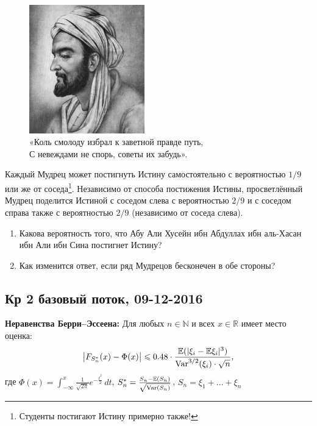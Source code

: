 \documentclass[12pt, a4paper]{article}\usepackage[]{graphicx}\usepackage[]{color}
\begin{document}
\begin{enumerate}
\begin{figure}[h!]
  \begin{center}
\includegraphics[width=5cm]{images/abu_ali.jpg}
  \caption*{«Коль смолоду избрал к заветной правде путь, \\
 С невеждами не спорь, советы их забудь». }
 \end{center}
\end{figure}


Каждый Мудрец может постигнуть Истину самостоятельно с вероятностью $1/9$ или же от соседа\footnote{Студенты постигают Истину примерно также!}. Независимо от способа постижения Истины, просветлённый Мудрец поделится Истиной с соседом слева с вероятностью $2/9$ и с соседом справа также с вероятностью $2/9$ (независимо от соседа слева).


\begin{enumerate}
\item Какова вероятность того, что Абу Али Хусейн ибн Абдуллах ибн аль-Хасан ибн Али ибн Сина постигнет Истину?
\item Как изменится ответ, если ряд Мудрецов бесконечен в обе стороны?
\end{enumerate}

\end{enumerate}


\subsection{Кр 2 базовый поток, 09-12-2016}


\textbf{Неравенства Берри–Эссеена:} Для любых $n \in \mathbb{N}$ и всех $x \in \mathbb{R}$ имеет место оценка:
\[
    \bigl|F_{S_n^{*}}(x) - \Phi(x)\bigr| \leqslant 0.48 \cdot \frac{\mathbb{E}(|\xi_i - \mathbb{E}\xi_i|^3)}{\operatorname{Var}^{3/2}(\xi_i)\cdot\sqrt{n}} \text{,}
\]
где $\Phi(x) = \int_{-\infty}^{x}\frac{1}{\sqrt{2\pi}}e^{-\frac{t^2}{2}}\,dt$, \; $S_n^* = \frac{S_n - \mathbb{E}(S_n)}{\sqrt{\operatorname{Var}(S_n)}}$, \; $S_n = \xi_1 + \ldots + \xi_n$
\end{document}
